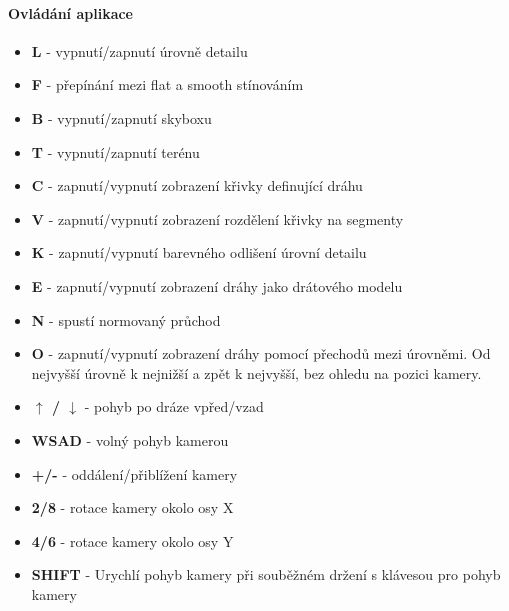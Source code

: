 \paragraph{Ovládání aplikace}
\begin{itemize} \itemsep1pt \parskip0pt 
\item[] \textbf{L} - vypnutí/zapnutí úrovně detailu
\item[] \textbf{F} - přepínání mezi flat a smooth stínováním
\item[] \textbf{B} - vypnutí/zapnutí skyboxu
\item[] \textbf{T} - vypnutí/zapnutí terénu
\item[] \textbf{C} - zapnutí/vypnutí zobrazení křivky definující dráhu
\item[] \textbf{V} - zapnutí/vypnutí zobrazení rozdělení křivky na segmenty
\item[] \textbf{K} - zapnutí/vypnutí barevného odlišení úrovní detailu
\item[] \textbf{E} - zapnutí/vypnutí zobrazení dráhy jako drátového modelu
\item[] \textbf{N} - spustí normovaný průchod
\item[] \textbf{O} - zapnutí/vypnutí zobrazení dráhy pomocí přechodů mezi úrovněmi. Od nejvyšší úrovně k nejnižší a zpět k nejvyšší, bez ohledu na pozici kamery.
\item[] \textbf{$\uparrow$ / $\downarrow$} - pohyb po dráze vpřed/vzad
\item[] \textbf{WSAD} - volný pohyb kamerou
\item[] \textbf{+/-} - oddálení/přiblížení kamery
\item[] \textbf{2/8} - rotace kamery okolo osy X
\item[] \textbf{4/6} - rotace kamery okolo osy Y
\item[] \textbf{SHIFT} - Urychlí pohyb kamery při souběžném držení s klávesou pro pohyb kamery 
\end{itemize}

